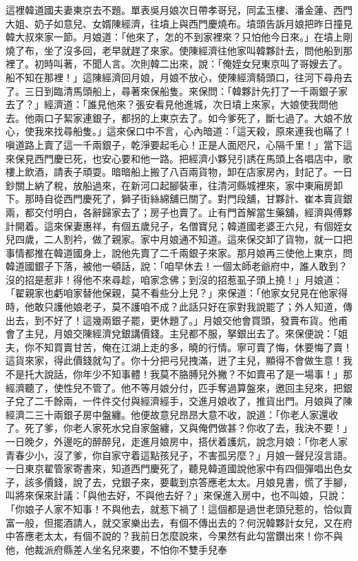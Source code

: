 \begin{showcontents}{}
這裡韓道國夫妻東京去不題。單表吳月娘次日帶孝哥兒，同孟玉樓、潘金蓮、西門大姐、奶子如意兒、女婿陳經濟，往墳上與西門慶燒布。墳頭告訴月娘把昨日撞見韓大叔來家一節。月娘道：「他來了，怎的不到家裡來？只怕他今日來。」在墳上剛燒了布，坐了沒多回，老早就趕了來家。使陳經濟往他家叫韓夥計去，問他船到那裡了。初時叫著，不聞人言。次則韓二出來，說：「俺姪女兒東京叫了哥嫂去了。船不知在那裡！」這陳經濟回月娘，月娘不放心，使陳經濟騎頭口，往河下尋舟去了。三日到臨清馬頭船上，尋著來保船隻。來保問：「韓夥計先打了一千兩銀子家去了？」經濟道：「誰見他來？張安看見他進城，次日墳上來家，大娘使我問他去。他兩口子絜家連銀子，都拐的上東京去了。如今爹死了，斷七過了。大娘不放心，使我來找尋船隻。」這來保口中不言，心內暗道：「這天殺，原來連我也瞞了！嗔道路上賣了這一千兩銀子，乾淨要起毛心！正是人面咫尺，心隔千里！」當下這來保見西門慶已死，也安心要和他一路。把經濟小夥兒引誘在馬頭上各唱店中，歌樓上飲酒，請表子頑耍。暗暗船上搬了八百兩貨物，卸在店家房內，封記了。一日鈔關上納了稅，放船過來，在新河口起腳裝車，往清河縣城裡來，家中東廂房卸下。那時自從西門慶死了，獅子街絲綿舖已關了。對門段舖，甘夥計、崔本賣貨銀兩，都交付明白，各辭歸家去了；房子也賣了。止有門首解當生藥舖，經濟與傅夥計開着。這來保妻惠祥，有個五歲兒子，名僧寶兒；韓道國老婆王六兒，有個姪女兒四歲，二人割衿，做了親家。家中月娘通不知道。這來保交卸了貨物，就一口把事情都推在韓道國身上，說他先賣了二千兩銀子來家。那月娘再三使他上東京，問韓道國銀子下落，被他一頓話，說：「咱早休去！一個太師老爺府中，誰人敢到？沒的招是惹非！得他不來尋趁，咱家念佛；到沒的招惹虱子頭上撓！」月娘道：「翟親家也虧咱家替他保親，莫不看些分上兒？」來保道：「他家女兒見在他家得時，他敢只護他娘老子，莫不護咱不成？此話只好在家對我說罷了；外人知道，傳出去，到不好了！這幾兩銀子罷，更休題了。」月娘交他會買頭，發賣布貨。他甫會了主兒，月娘交陳經濟兌銀講價錢。主兒都不服，拏銀出去了。來保便說：「姐夫，你不知買賣甘苦，俺在江湖上走的多，曉的行情。寧可賣了悔，休要悔了賣！這貨來家，得此價錢就勾了。你十分把弓兒拽滿，迸了主兒，顯得不會做生意！我不是托大說話，你年少不知事體！我莫不胳膊兒外撇？不如賣弔了是一場事！」那經濟聽了，使性兒不管了。他不等月娘分付，匹手奪過算盤來，邀回主兒來，把銀子兌了二千餘兩，一件件交付與經濟經手，交進月娘收了，推貨出門。月娘與了陳經濟二三十兩銀子房中盤纏。他便故意兒昂昂大意不收，說道：「你老人家還收了。死了爹，你老人家死水兌自家盤纏，又與俺們做甚？你收了去，我決不要！」一日晚夕，外邊吃的醉醉兒，走進月娘房中，搭伏着護炕，說念月娘：「你老人家青春少小，沒了爹，你自家守着這點孩兒子，不害孤另麼？」月娘一聲兒沒言語。一日東京翟管家寄書來，知道西門慶死了，聽見韓道國說他家中有四個彈唱出色女子，該多價錢，說了去，兌銀子來，要載到京答應老太太。月娘見書，慌了手腳，叫將來保來計議：「與他去好，不與他去好？」來保進入房中，也不叫娘，只說：「你娘子人家不知事！不與他去，就惹下禍了！這個都是過世老頭兒惹的，恰似賣富一般，但擺酒請人，就交家樂出去，有個不傳出去的？何況韓夥計女兒，又在府中答應老太太，有個不說的？我前日怎麼說來，今果然有此勾當鑽出來！你不與他，他裁派府縣差人坐名兒來要，不怕你不雙手兒奉
\end{showcontents}
